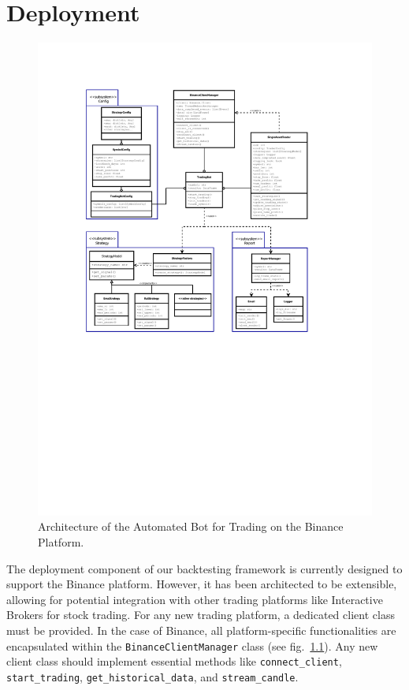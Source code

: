 \chapter{Deployment}


\begin{figure}[H]
\centering
\includegraphics[page=1, trim=30mm 110mm 30mm 25mm, width=1.1\textwidth, clip]{./pdf/deployment_uml.pdf}
\caption{Architecture of the Automated Bot for Trading on the Binance Platform.}
\label{fig:deployment_arch}
\end{figure}

The deployment component of our backtesting framework is currently designed to support the Binance platform.
However, it has been architected to be extensible, allowing for potential integration with other trading platforms like Interactive Brokers for stock trading.
For any new trading platform, a dedicated client class must be provided.
In the case of Binance, all platform-specific functionalities are encapsulated within the \texttt{BinanceClientManager} class (see fig.~\ref{fig:deployment_arch}).
Any new client class should implement essential methods like \texttt{connect\_client}, \texttt{start\_trading}, \texttt{get\_historical\_data}, and \texttt{stream\_candle}.



